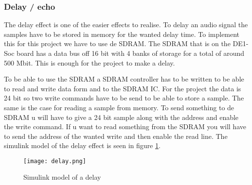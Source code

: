 \subsubsection{Delay / echo}
The delay effect is one of the easier effects to realise. To delay an audio signal the samples have to be stored in memory for the wanted delay time. To implement this for this project we have to use de SDRAM. The SDRAM that is on the DE1-Soc board has a data bus off 16 bit with 4 banks of storage for a total of around 500 Mbit. This is enough for the project to make a delay.
\par
\noindent To be able to use the SDRAM a SDRAM controller has to be written to be able to read and write data form and to the SDRAM IC. For the  project the data is 24 bit so two write commands have to be send to be able to store a sample. The same is the case for reading a sample from memory. To send something to de SDRAM u will have to give a 24 bit sample along with the address and enable the write command. If u want to read something from the SDRAM you will have to send the address of the wanted write and then enable the read line. 
\noindent The simulink model of the delay effect is seen in figure \ref{fig:delaysimulink}.

\begin{figure}[ht]
    \centering
    \texttt{[image: delay.png]}
    \caption{Simulink model of a delay}
    \label{fig:delaysimulink}
\end{figure}

